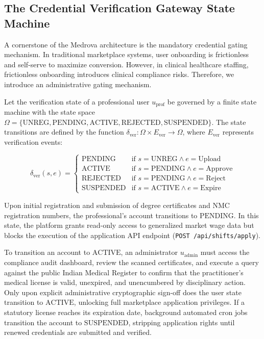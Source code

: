 \documentclass[conference]{IEEEtran}
\begin{document}
\subsection{The Credential Verification Gateway State Machine}
A cornerstone of the Medrova architecture is the mandatory credential gating mechanism. In traditional marketplace systems, user onboarding is frictionless and self-serve to maximize conversion. However, in clinical healthcare staffing, frictionless onboarding introduces clinical compliance risks. Therefore, we introduce an administrative gating mechanism.

Let the verification state of a professional user $u_{\text{prof}}$ be governed by a finite state machine with the state space $\Omega = \{\text{UNREG}, \text{PENDING}, \text{ACTIVE}, \text{REJECTED}, \text{SUSPENDED}\}$. The state transitions are defined by the function $\delta_{\text{ver}}: \Omega \times E_{\text{ver}} \rightarrow \Omega$, where $E_{\text{ver}}$ represents verification events:

\begin{equation}
\delta_{\text{ver}}(s, e) = 
\begin{cases} 
\text{PENDING} & \text{if } s = \text{UNREG} \land e = \text{Upload} \\
\text{ACTIVE} & \text{if } s = \text{PENDING} \land e = \text{Approve} \\
\text{REJECTED} & \text{if } s = \text{PENDING} \land e = \text{Reject} \\
\text{SUSPENDED} & \text{if } s = \text{ACTIVE} \land e = \text{Expire}
\end{cases}
\end{equation}

Upon initial registration and submission of degree certificates and NMC registration numbers, the professional's account transitions to $\text{PENDING}$. In this state, the platform grants read-only access to generalized market wage data but blocks the execution of the application API endpoint (\texttt{POST /api/shifts/apply}). 

To transition an account to $\text{ACTIVE}$, an administrator $u_{\text{admin}}$ must access the compliance audit dashboard, review the scanned certificates, and execute a query against the public Indian Medical Register \cite{nmc2023register} to confirm that the practitioner's medical license is valid, unexpired, and unencumbered by disciplinary action. Only upon explicit administrative cryptographic sign-off does the user state transition to $\text{ACTIVE}$, unlocking full marketplace application privileges. If a statutory license reaches its expiration date, background automated cron jobs transition the account to $\text{SUSPENDED}$, stripping application rights until renewed credentials are submitted and verified.
\end{document}
